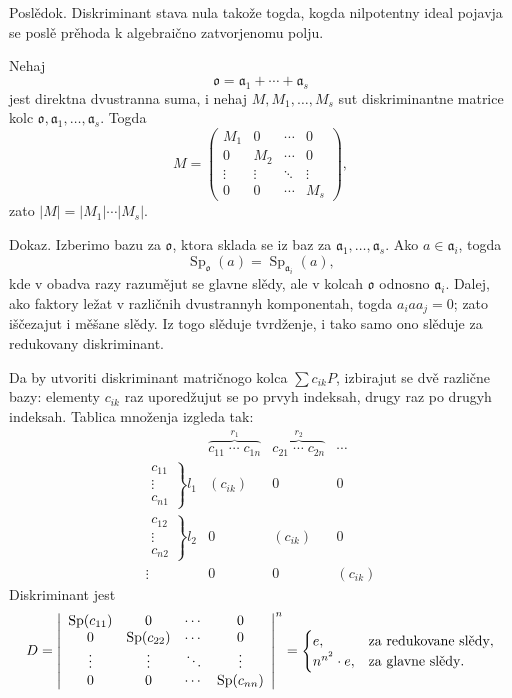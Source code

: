 \documentclass[11pt]{article}
\providecommand{\mo}{\mathfrak{o}}
\providecommand{\ma}{\mathfrak{a}}
\begin{document}
Poslědok. Diskriminant stava nula takože togda, kogda nilpotentny ideal pojavja se poslě prěhoda k algebraično zatvorjenomu polju.

Nehaj
\[
        \mo=\ma_1+\cdots+\ma_s
\]
jest direktna dvustranna suma, i nehaj $M,M_1,\ldots,M_s$ sut diskriminantne matrice kolc $\mo,\ma_1,\ldots,\ma_s$. Togda
\[
        M=\begin{pmatrix}
        M_1&0&\cdots&0\\
        0&M_2&\cdots&0\\
        \vdots&\vdots&\ddots&\vdots\\
        0&0&\cdots&M_s
        \end{pmatrix},
\]
zato $|M|=|M_1|\cdots|M_s|$.

Dokaz. Izberimo bazu za $\mo$, ktora sklada se iz baz za $\ma_1,\ldots,\ma_s$. Ako $a\in\ma_i$, togda
\[
        \operatorname{Sp}_{\mo}(a)=\operatorname{Sp}_{\ma_i}(a),
\]
kde v obadva razy razumějut se glavne slědy, ale v kolcah $\mo$ odnosno $\ma_i$. Dalej, ako faktory ležat v različnih dvustrannyh komponentah, togda $a_i a a_j=0$; zato iščezajut i měšane slědy. Iz togo slěduje tvrdženje, i tako samo ono slěduje za redukovany diskriminant.

Da by utvoriti diskriminant matričnogo kolca $\sum c_{ik}P$, izbirajut se dvě različne bazy: elementy $c_{ik}$ raz uporedžujut se po prvyh indeksah, drugy raz po drugyh indeksah. Tablica množenja izgleda tak:
\[
\begin{array}{c|ccc}
& \overbrace{c_{11}\;\cdots\;c_{1n}}^{r_1}
& \overbrace{c_{21}\;\cdots\;c_{2n}}^{r_2}
& \cdots \\ \hline
\left.\begin{array}{c}c_{11}\\[-1mm]\vdots\\[-1mm]c_{n1}\end{array}\right\}l_1
& (c_{ik}) & 0 & 0 \\[1.3em]
\left.\begin{array}{c}c_{12}\\[-1mm]\vdots\\[-1mm]c_{n2}\end{array}\right\}l_2
& 0 & (c_{ik}) & 0 \\[1.3em]
\vdots & 0 & 0 & (c_{ik})
\end{array}
\]
Diskriminant jest
\[
        D=\left|\begin{array}{cccc}
        \operatorname{Sp}(c_{11})&0&\cdots&0\\
        0&\operatorname{Sp}(c_{22})&\cdots&0\\
        \vdots&\vdots&\ddots&\vdots\\
        0&0&\cdots&\operatorname{Sp}(c_{nn})
        \end{array}\right|^{n}
        =\begin{cases}
        e, & \hbox{za redukovane slědy},\\
        n^{n^2}\cdot e, & \hbox{za glavne slědy}.
        \end{cases}
\]
\end{document}
